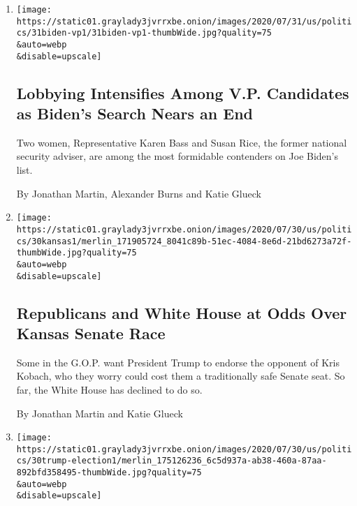 \begin{enumerate}
\def\labelenumi{\arabic{enumi}.}
\item
  \href{/2020/07/31/us/politics/joseph-biden-vice-president.html}{}

  \texttt{[image: https://static01.graylady3jvrrxbe.onion/images/2020/07/31/us/politics/31biden-vp1/31biden-vp1-thumbWide.jpg?quality=75\\\&auto=webp\\\&disable=upscale]}

  \hypertarget{lobbying-intensifies-among-vp-candidates-as-bidens-search-nears-an-end}{%
  \subsection{Lobbying Intensifies Among V.P. Candidates as Biden's
  Search Nears an
  End}\label{lobbying-intensifies-among-vp-candidates-as-bidens-search-nears-an-end}}

  Two women, Representative Karen Bass and Susan Rice, the former
  national security adviser, are among the most formidable contenders on
  Joe Biden's list.

  By Jonathan Martin, Alexander Burns and Katie Glueck
\item
  \href{/2020/07/30/us/politics/kansas-senate-kobach-trump.html}{}

  \texttt{[image: https://static01.graylady3jvrrxbe.onion/images/2020/07/30/us/politics/30kansas1/merlin\_171905724\_8041c89b-51ec-4084-8e6d-21bd6273a72f-thumbWide.jpg?quality=75\\\&auto=webp\\\&disable=upscale]}

  \hypertarget{republicans-and-white-house-at-odds-over-kansas-senate-race}{%
  \subsection{Republicans and White House at Odds Over Kansas Senate
  Race}\label{republicans-and-white-house-at-odds-over-kansas-senate-race}}

  Some in the G.O.P. want President Trump to endorse the opponent of
  Kris Kobach, who they worry could cost them a traditionally safe
  Senate seat. So far, the White House has declined to do so.

  By Jonathan Martin and Katie Glueck
\item
  \href{/2020/07/30/us/politics/trump-delay-2020-election.html}{}

  \texttt{[image: https://static01.graylady3jvrrxbe.onion/images/2020/07/30/us/politics/30trump-election1/merlin\_175126236\_6c5d937a-ab38-460a-87aa-892bfd358495-thumbWide.jpg?quality=75\\\&auto=webp\\\&disable=upscale]}


\end{enumerate}
